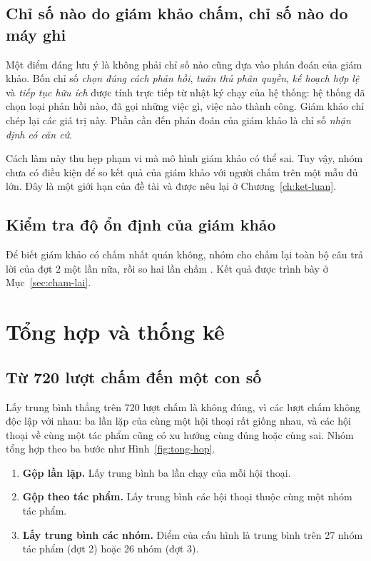 \subsection{Chỉ số nào do giám khảo chấm, chỉ số nào do máy ghi}

Một điểm đáng lưu ý là không phải chỉ số nào cũng dựa vào phán đoán của giám khảo. Bốn chỉ số \emph{chọn đúng cách phản hồi}, \emph{tuân thủ phân quyền}, \emph{kế hoạch hợp lệ} và \emph{tiếp tục hữu ích} được tính trực tiếp từ nhật ký chạy của hệ thống: hệ thống đã chọn loại phản hồi nào, đã gọi những việc gì, việc nào thành công. Giám khảo chỉ chép lại các giá trị này. Phần cần đến phán đoán của giám khảo là chỉ số \emph{nhận định có căn cứ}.

Cách làm này thu hẹp phạm vi mà mô hình giám khảo có thể sai. Tuy vậy, nhóm chưa có điều kiện để so kết quả của giám khảo với người chấm trên một mẫu đủ lớn. Đây là một giới hạn của đề tài và được nêu lại ở Chương~\ref{ch:ket-luan}.

\subsection{Kiểm tra độ ổn định của giám khảo}

Để biết giám khảo có chấm nhất quán không, nhóm cho chấm lại toàn bộ câu trả lời của đợt 2 một lần nữa, rồi so hai lần chấm . Kết quả được trình bày ở Mục~\ref{sec:cham-lai}.

\section{Tổng hợp và thống kê}

\subsection{Từ 720 lượt chấm đến một con số}

Lấy trung bình thẳng trên 720 lượt chấm là không đúng, vì các lượt chấm không độc lập với nhau: ba lần lặp của cùng một hội thoại rất giống nhau, và các hội thoại về cùng một tác phẩm cũng có xu hướng cùng đúng hoặc cùng sai. Nhóm tổng hợp theo ba bước như Hình~\ref{fig:tong-hop}.


\begin{enumerate}
    \item \textbf{Gộp lần lặp.} Lấy trung bình ba lần chạy của mỗi hội thoại.
    \item \textbf{Gộp theo tác phẩm.} Lấy trung bình các hội thoại thuộc cùng một nhóm tác phẩm.
    \item \textbf{Lấy trung bình các nhóm.} Điểm của cấu hình là trung bình trên 27 nhóm tác phẩm (đợt 2) hoặc 26 nhóm (đợt 3).
\end{enumerate}

